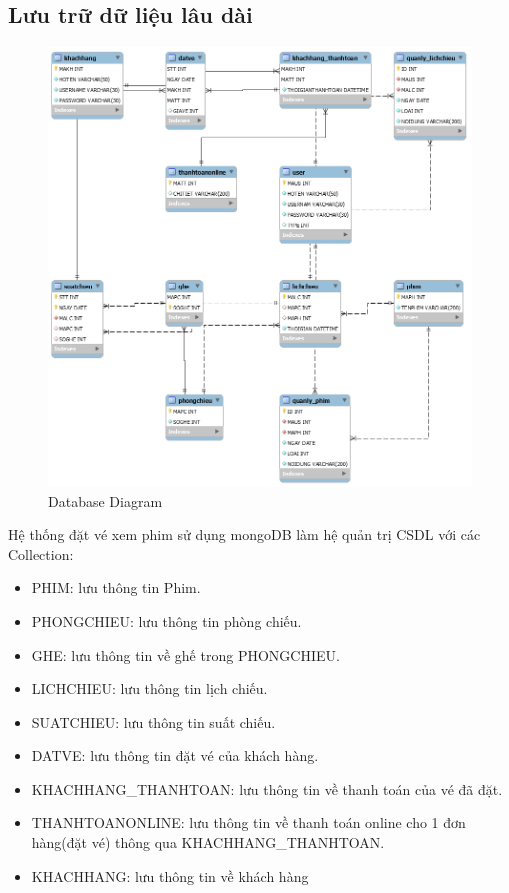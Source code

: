 \documentclass[a4paper, 12pt]{article}
\begin{document}
\subsection{Lưu trữ dữ liệu lâu dài}
		\begin{figure}[H]
		\begin{center}
			\includegraphics[scale = 0.25]{image/4.4.png}
			\caption{Database Diagram}
		\end{center}
	\end{figure}
	Hệ thống đặt vé xem phim sử dụng mongoDB làm hệ quản trị CSDL với các Collection:
	\begin{itemize}
		\item PHIM: lưu thông tin Phim.
		\item PHONGCHIEU: lưu thông tin phòng chiếu.
		\item GHE: lưu thông tin về ghế trong PHONGCHIEU.
		\item LICHCHIEU: lưu thông tin lịch chiếu.
		\item SUATCHIEU: lưu thông tin suất chiếu.
		\item DATVE: lưu thông tin đặt vé của khách hàng.
		\item KHACHHANG\_THANHTOAN: lưu thông tin về thanh toán của vé đã đặt.
		\item THANHTOANONLINE: lưu thông tin về thanh toán online cho 1 đơn hàng(đặt vé) thông qua KHACHHANG\_THANHTOAN.
		\item KHACHHANG: lưu thông tin về khách hàng
	\end{itemize}	
\end{document}
